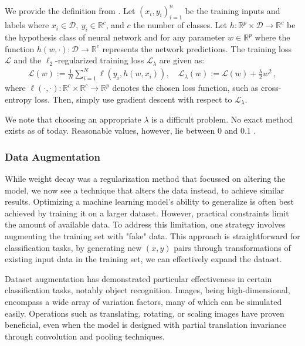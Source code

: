 \documentclass{article}
\begin{document}
We provide the definition from \cite{andriushchenko2023need}. Let $(x_i,y_i)_{i = 1}^{n}$ be the training inputs and labels where $x_i \in \mathcal{D},~y_i \in \mathbb{R}^{c}$, and $c$ the number of classes. Let $h: \mathbb{R}^{p} \times \mathcal{D} \to \mathbb{R}^{c}$ be the hypothesis class of neural network and for any parameter $w \in \mathbb{R}^{p}$ where the function $h(w, \cdot): \mathcal{D} \to \mathbb{R}^{c}$ represents the network predictions. The training loss $\mathcal{L}$ and the $\ell_2$-regularized training loss $\mathcal{L}_{\lambda}$ are given as: 
\begin{align}
\label{eq:general_loss}
    \mathcal{L}(w):= \frac{1}{N} \sum_{i=1}^{N} \ell \left(y_i, h({w}, x_i)\right), \quad \mathcal{L}_{\lambda}(w) := \mathcal{L}(w) + \frac{\lambda}{2} {w}^2 \, ,
\end{align}
where $\ell(\cdot,\cdot):\mathbb{R}^c \times \mathbb{R}^c \to \mathbb{R}^p$ denotes the chosen loss function, such as cross-entropy loss. Then, simply use gradient descent with respect to $\mathcal{L}_{\lambda}.$

We note that choosing an appropriate $\lambda$ is a difficult problem. No exact method exists as of today. Reasonable values, however, lie between $0$ and $0.1$ \citep{Kuhn_13}. 
\subsubsection{Data Augmentation}%
  \label{sub:Data Augmentation}
  While weight decay was a regularization method that focussed on altering the model, we now see a technique that alters the data instead, to achieve similar results. Optimizing a machine learning model's ability to generalize is often best achieved by training it on a larger dataset. However, practical constraints limit the amount of available data. To address this limitation, one strategy involves augmenting the training set with "fake" data. This approach is straightforward for classification tasks, by generating new $(x, y)$ pairs through transformations of existing input data in the training set, we can effectively expand the dataset.

Dataset augmentation has demonstrated particular effectiveness in certain classification tasks, notably object recognition. Images, being high-dimensional, encompass a wide array of variation factors, many of which can be simulated easily. Operations such as translating, rotating, or scaling images have proven beneficial, even when the model is designed with partial translation invariance through convolution and pooling techniques.
\end{document}
